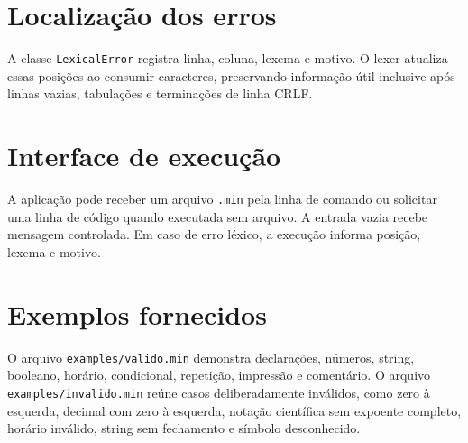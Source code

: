 \section{Localização dos erros}

A classe \texttt{LexicalError} registra linha, coluna, lexema e motivo. O lexer atualiza essas posições ao consumir caracteres, preservando informação útil inclusive após linhas vazias, tabulações e terminações de linha CRLF.

\section{Interface de execução}

A aplicação pode receber um arquivo \texttt{.min} pela linha de comando ou solicitar uma linha de código quando executada sem arquivo. A entrada vazia recebe mensagem controlada. Em caso de erro léxico, a execução informa posição, lexema e motivo.

\section{Exemplos fornecidos}

O arquivo \texttt{examples/valido.min} demonstra declarações, números, string, booleano, horário, condicional, repetição, impressão e comentário. O arquivo \texttt{examples/invalido.min} reúne casos deliberadamente inválidos, como zero à esquerda, decimal com zero à esquerda, notação científica sem expoente completo, horário inválido, string sem fechamento e símbolo desconhecido.
